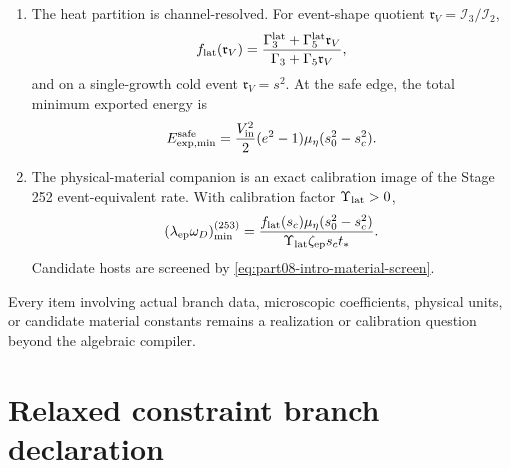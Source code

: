 \begin{theorem}
\begin{enumerate}[leftmargin=2.2em]
  \begin{equation}
  \label{eq:part08-main-kexp}
  K_{\rm exp}(s)=\Gamma_3s^3+\Gamma_5s^5,
  \qquad
  \Gamma_3,\Gamma_5\ge0.
  \end{equation}
  The positive growth root is reduced but not eliminated by any finite passive \((\Gamma_3,\Gamma_5)\) in this minimal closure.  The exact event-safe condition is
  \begin{equation}
  \label{eq:part08-main-safe-half-plane}
  \widehat\Gamma_3+s_c^2\widehat\Gamma_5
  \ge
  \frac{s_0^2-s_c^2}{s_c^3},
  \qquad
  \widehat\Gamma_n:=\Gamma_n/\mu_\eta.
  \end{equation}
  \item The heat partition is channel-resolved.  For event-shape quotient \(\mathfrak r_V=\mathcal I_3/\mathcal I_2\),
  \begin{equation}
  \label{eq:part08-main-heat-fraction}
  f_{\rm lat}(\mathfrak r_V)=
  \frac{\Gamma_3^{\rm lat}+\Gamma_5^{\rm lat}\mathfrak r_V}{\Gamma_3+\Gamma_5\mathfrak r_V},
  \end{equation}
  and on a single-growth cold event \(\mathfrak r_V=s^2\).  At the safe edge, the total minimum exported energy is
  \begin{equation}
  \label{eq:part08-main-safe-energy}
  E_{\rm exp,min}^{\rm safe}
  =
  \frac{V_{\rm in}^{2}}{2}(e^2-1)\mu_\eta(s_0^2-s_c^2).
  \end{equation}
  \item The physical-material companion is an exact calibration image of the Stage 252 event-equivalent rate.  With calibration factor \(\Upsilon_{\rm lat}>0\),
  \begin{equation}
  \label{eq:part08-main-ep-threshold}
  (\lambda_{\rm ep}\omega_D)_{\min}^{(253)}
  =
  \frac{f_{\rm lat}(s_c)\mu_\eta(s_0^2-s_c^2)}
  {\Upsilon_{\rm lat}\zeta_{\rm ep}s_ct_*}.
  \end{equation}
  Candidate hosts are screened by \cref{eq:part08-intro-material-screen}.
\end{enumerate}
Every item involving actual branch data, microscopic coefficients, physical units, or candidate material constants remains a realization or calibration question beyond the algebraic compiler.
\end{theorem}

\section{Relaxed constraint branch declaration}
\label{sec:part08_relaxed_branch:relaxed-constraint-branch-declaration}

